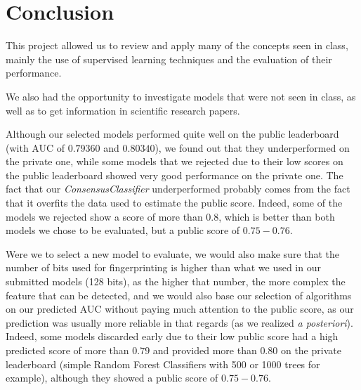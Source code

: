 \section{Conclusion}
This project allowed us to review and apply many of the concepts seen in class, mainly the use of supervised learning techniques and the evaluation of their performance.

We also had the opportunity to investigate models that were not seen in class, as well as to get information in scientific research papers.

Although our selected models performed quite well on the public leaderboard (with AUC of $0.79360$ and $0.80340$), we found out that they underperformed on the private one, while some models that we rejected due to their low scores on the public leaderboard showed very good performance on the private one. The fact that our \textit{ConsensusClassifier} underperformed probably comes from the fact that it overfits the data used to estimate the public score. Indeed, some of the models we rejected show a score of more than $0.8$, which is better than both models we chose to be evaluated, but a public score of $0.75-0.76$.

Were we to select a new model to evaluate, we would also make sure that the number of bits used for fingerprinting is higher than what we used in our submitted models (128 bits), as the higher that number, the more complex the feature that can be detected, and we would also base our selection of algorithms on our predicted AUC without paying much attention to the public score, as our prediction was usually more reliable in that regards (as we realized \textit{a posteriori}). Indeed, some models discarded early due to their low public score had a high predicted score of more than $0.79$ and provided more than $0.80$ on the private leaderboard (simple Random Forest Classifiers with 500 or 1000 trees for example), although they showed a public score of $0.75-0.76$.
